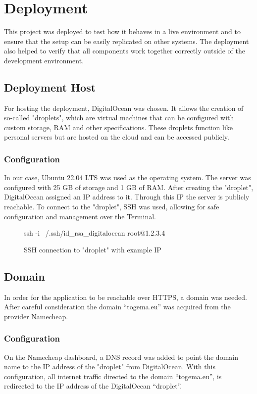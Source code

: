 \documentclass[a4paper,12pt]{report}
\begin{document}
\section{Deployment}
This project was deployed to test how it behaves in a live environment and to ensure that the setup can be easily replicated on other systems. The deployment also helped to verify that all components work together correctly outside of the development environment. \\
\subsection{Deployment Host}
For hosting the deployment, DigitalOcean was chosen. It allows the creation of so-called "droplets", which are virtual machines that can be configured with custom storage, RAM and other specifications. These droplets function like personal servers but are hosted on the cloud and can be accessed publicly.
\subsubsection{Configuration}
In our case, Ubuntu 22.04 LTS was used as the operating system. The server was configured with 25 GB of storage and 1 GB of RAM. After creating the "droplet", DigitalOcean assigned an IP address to it. Through this IP the server is publicly reachable. To connect to the "droplet", SSH was used, allowing for safe configuration and management over the Terminal.
\begin{figure}[H]
	\begin{terminal}
		ssh -i ~/.ssh/id_rsa_digitalocean root@1.2.3.4
	\end{terminal}
	\caption{SSH connection to "droplet" with example IP}
\end{figure}
\subsection{Domain}
In order for the application to be reachable over HTTPS, a domain was needed. After careful consideration the domain “togema.eu” was acquired from the provider Namecheap.
\subsubsection{Configuration}
On the Namecheap dashboard, a DNS record was added to point the domain name to the IP address of the "droplet" from DigitalOcean. With this configuration, all internet traffic directed to the domain “togema.eu”, is redirected to the IP address of the DigitalOcean “droplet”. \\
\end{document}
